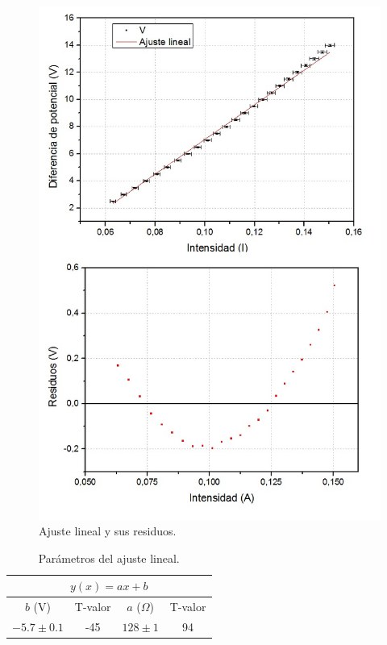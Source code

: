 \documentclass[twoside,twocolumn,a4paper]{article}
\begin{document}
\begin{figure}[h]
\includegraphics[width=\linewidth]{fig_line.jpg}
\caption{Ajuste lineal y sus residuos.}
\label{fig:line}
\end{figure}

\begin{table}[h]
\centering
\caption{Par\'ametros del ajuste lineal.}
\label{tab:line}
\begin{tabular}{|c|c|c|c|}
\hline
\multicolumn{4}{|c|}{$y(x)=ax+b$}           \\ \hline
$b$ (V)        & T-valor & $a$ ($\Omega$) & T-valor \\ \hline
$-5.7\pm0.1$ & -45     & $128\pm1$   & 94      \\ \hline
\end{tabular}
\end{table}
\end{document}

